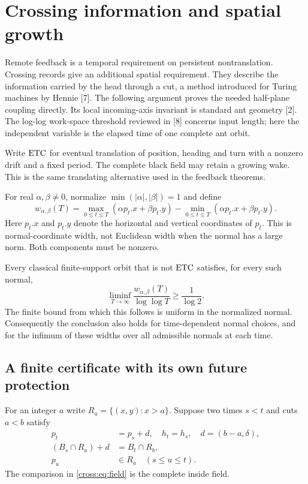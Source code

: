 \section{Crossing information and spatial growth}\label{cross:sec:crossing}
Remote feedback is a temporal requirement on persistent nontranslation. Crossing
records give an additional spatial requirement. They describe the information
carried by the head through a cut, a method introduced for Turing machines by
Hennie [7]. The following argument proves the needed half-plane coupling directly.
Its local incoming-axis invariant is standard ant geometry [2].
The log-log work-space threshold reviewed in [8] concerns input length; here
the independent variable is the elapsed time of one complete ant orbit.

Write $\mathrm{ETC}$ for eventual translation of position, heading and turn with a
nonzero drift and a fixed period. The complete black field may retain a growing
wake. This is the same translating alternative used in the feedback theorems.

For real $\alpha,\beta\ne0$, normalize
$\min(|\alpha|,|\beta|)=1$ and define
\[
 w_{\alpha,\beta}(T)=
 \max_{0\le t\le T}(\alpha p_t.x+\beta p_t.y)
 -\min_{0\le t\le T}(\alpha p_t.x+\beta p_t.y).
\]
Here $p_t.x$ and $p_t.y$ denote the horizontal and vertical coordinates of $p_t$.
This is normal-coordinate width, not Euclidean width when the normal has a
large norm. Both components must be nonzero.

\begin{theorem}\label{cross:thm:gap}
Every classical finite-support orbit that is not $\mathrm{ETC}$ satisfies, for every
such normal,
\[
 \liminf_{T\to\infty}\frac{w_{\alpha,\beta}(T)}{\log\log T}
 \ge\frac1{\log2}.
\]
The finite bound from which this follows is uniform in the normalized normal.
Consequently the conclusion also holds for time-dependent normal choices,
and for the infimum of these widths over all admissible normals at each time.
\end{theorem}
\subsection{A finite certificate with its own future protection}
For an integer $a$ write $R_a=\{(x,y):x>a\}$. Suppose two times $s<t$ and cuts
$a<b$ satisfy
\begin{align}
 p_t&=p_s+d,\quad h_t=h_s,\quad d=(b-a,\delta),\label{cross:eq:poses}\\
 (B_s\cap R_a)+d&=B_t\cap R_b,\label{cross:eq:field}\\
 p_u&\in R_a\quad(s\le u\le t).\label{cross:eq:guard}
\end{align}
The comparison in \eqref{cross:eq:field} is the complete inside field.


